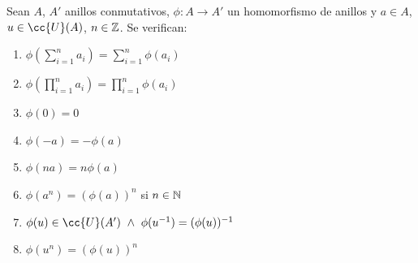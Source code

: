 \begin{prop}
    Sean $A$, $A'$ anillos conmutativos, $\phi:A \longrightarrow A'$ un homomorfismo de anillos y $a \in A$, $u \in \cc{U}(A)$, $n \in \mathbb Z$.
    Se verifican:
    \begin{enumerate}
        \item $\phi\left( \sum\limits_{i=1}^n a_i \right) = \sum\limits_{i=1}^{n} \phi(a_i)$
        \item $\phi\left( \prod\limits_{i=1}^n a_i \right) = \prod\limits_{i=1}^n \phi(a_i)$
        \item $\phi(0)=0$
        \item $\phi(-a) = -\phi(a)$
        \item $\phi(na) = n\phi(a)$
        \item $\phi(a^n) = (\phi(a))^n$ si $n \in \mathbb N$
        \item $\phi(u) \in \cc{U}(A') \y \phi(u^{-1}) = (\phi(u))^{-1}$
        \item $\phi(u^n) = (\phi(u))^n$
    \end{enumerate}
\end{prop}
